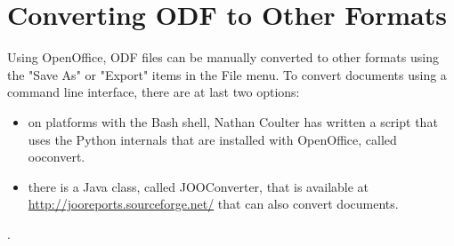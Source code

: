 \documentclass[12pt]{article}
\begin{document}
\section{Converting ODF to Other Formats}

Using OpenOffice, ODF files can be manually converted to other formats using the  "Save As" or "Export" items in the File menu. To convert documents using a command line interface, there are at last two options:
\begin{itemize}
\item on platforms with the Bash shell, Nathan Coulter has written a script that uses the Python internals that are installed with OpenOffice, called ooconvert.
\item there is a Java class, called  JOOConverter, that is available at \href{http://jooreports.sourceforge.net/} {http://jooreports.sourceforge.net/} that can also convert documents.
\end{itemize}.
\end{document}
